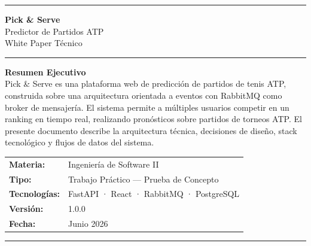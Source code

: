 \documentclass[12pt,a4paper]{article}
\begin{document}
\begin{titlepage}
  \thispagestyle{empty}

  \vspace*{2cm}
  \begin{center}
    {\color{accent}\rule{\linewidth}{3pt}}
    \vspace{0.5cm}

    {\huge\bfseries\color{navy} Pick \& Serve}\\[0.4cm]
    {\Large\color{accent} Predictor de Partidos ATP}\\[0.3cm]
    {\large White Paper Técnico}

    \vspace{0.5cm}
    {\color{accent}\rule{\linewidth}{1pt}}

    \vspace{2cm}

    \begin{tcolorbox}[colback=navy!5, colframe=navy!30, width=0.85\linewidth]
      \centering
      \textbf{Resumen Ejecutivo}\\[0.5em]
      \small
      Pick \& Serve es una plataforma web de predicción de partidos de tenis ATP,
      construida sobre una arquitectura orientada a eventos con RabbitMQ como broker de mensajería.
      El sistema permite a múltiples usuarios competir en un ranking en tiempo real, realizando
      pronósticos sobre partidos de torneos ATP. El presente documento describe la arquitectura
      técnica, decisiones de diseño, stack tecnológico y flujos de datos del sistema.
    \end{tcolorbox}

    \vspace{2.5cm}

    \begin{tabular}{ll}
      \textbf{Materia:}     & Ingeniería de Software II \\[4pt]
      \textbf{Tipo:}        & Trabajo Práctico — Prueba de Concepto \\[4pt]
      \textbf{Tecnologías:} & FastAPI · React · RabbitMQ · PostgreSQL \\[4pt]
      \textbf{Versión:}     & 1.0.0 \\[4pt]
      \textbf{Fecha:}       & Junio 2026 \\
    \end{tabular}

    \vfill
    {\color{accent}\rule{\linewidth}{2pt}}
  \end{center}
\end{titlepage}
\end{document}

